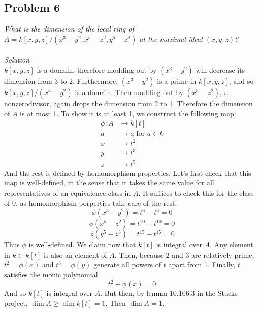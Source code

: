 \documentclass[12 pt]{article}
\begin{document}
\subsection*{Problem 6}
\emph{What is the dimension of the local ring of $A = k[x, y, z]/(x^3 - y^2, x^5 - z^2, y^5 - z^3)$ at the maximal ideal $(x, y, z)$?}
\\
\\
\emph{Solution}
\\
$k[x,y,z]$ is a domain, therefore modding out by $(x^3 - y^2)$ will decrease its dimension from 3 to 2. Furthermore, $(x^3 - y^2)$ is a prime in $k[x,y,z]$, and so $k[x,y,z] / (x^3 - y^2)$ is a domain. Then modding out by $(x^5 - z^2)$, a nonzerodivisor, again drops the dimension from 2 to 1. Therefore the dimension of $A$ is at most 1. To show it is at least 1, we construct the following map:
\begin{align*}    
\phi: A &\to k[t]   \\
 a &\to a \text{ for }a\in k \\
x &\to t^2 \\
y &\to t^3 \\
z &\to t^5
\end{align*}   
And the rest is defined by homomorphism properties. Let's first check that this map is well-defined, in the sense that it takes the same value for all representatives of an equivalence class in $A$. It suffices to check this for the class of $0$, as homomorphism porperties take care of the rest:
\[         \phi(x^3 - y^2) = t^6 - t^6 = 0        \]
\[         \phi(x^5 - z^2) = t^{10} - t^{10} = 0        \]
\[         \phi(y^5 - z^3) = t^{15} - t^{15} = 0        \]
Thus $\phi$ is well-defined. We claim now that $k[t]$ is integral over $A$. Any element in $k \subset k[t]$ is also an element of $A$. Then, because $2$ and $3$ are relatively prime, $t^2 = \phi(x)$ and $t^3 = \phi(y)$ generate all powers of $t$ apart from 1. Finally, $t$ satisfies the monic polynomial:
\[      t^2 - \phi(x) = 0     \]
And so $k[t]$ is integral over $A$. But then, by lemma 10.106.3 in the Stacks project, $\dim A \geq \dim k[t] = 1$. Then $\dim A = 1$.
\end{document}
